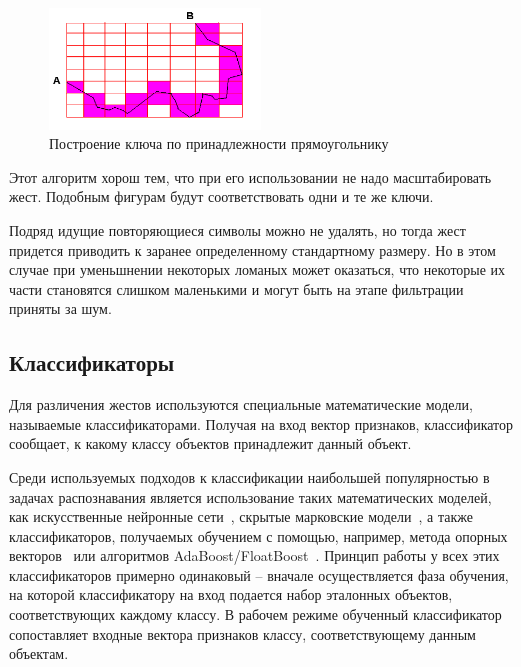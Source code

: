 \documentclass[a5paper]{article}
\begin{document}
\begin{figure} [ht]
  \begin{center}
    \includegraphics[width=0.5\textwidth, bb=0 0 544 390]{03-squares.png}
    \caption{Построение ключа по принадлежности прямоугольнику}
    \label{squares}
  \end{center}
\end{figure}

Этот алгоритм хорош тем, что при его использовании не надо масштабировать жест. Подобным фигурам будут соответствовать одни и те же ключи.

Подряд идущие повторяющиеся символы можно не удалять, но тогда жест придется приводить к заранее определенному стандартному размеру. 
Но в этом случае при уменьшнении некоторых ломаных может оказаться, что некоторые их части становятся слишком маленькими и
могут быть на этапе фильтрации приняты за шум.


\subsection{Классификаторы}

Для различения жестов используются специальные математические модели, называемые классификаторами. Получая на вход вектор признаков,
классификатор сообщает, к какому классу объектов принадлежит данный объект. 

Среди используемых подходов к классификации наибольшей популярностью в задачах распознавания является 
использование таких математических моделей, как искусственные нейронные сети~\cite{neuronet1, neuronet2, neuronet3}, 
скрытые марковские модели~\cite{hmm1, hmm2, hmm3}, а также классификаторов, получаемых обучением с помощью, например, 
метода опорных векторов~\cite{svm1, svm2} или алгоритмов AdaBoost/FloatBoost~\cite{boosting1, boosting2}.
Принцип работы у всех этих классификаторов примерно одинаковый -- вначале осуществляется фаза обучения, на которой классификатору на вход
подается набор эталонных объектов, соответствующих каждому классу. В рабочем режиме обученный классификатор сопоставляет входные вектора 
признаков классу, соответствующему данным объектам.
\end{document}
